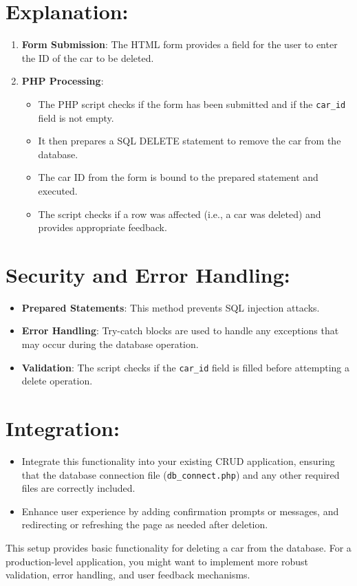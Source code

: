 \documentclass[11pt]{article}
\begin{document}
\section{Explanation:}
\label{sec:org5feed95}
\begin{enumerate}
\item \textbf{Form Submission}: The HTML form provides a field for the user to
enter the ID of the car to be deleted.

\item \textbf{PHP Processing}:

\begin{itemize}
\item The PHP script checks if the form has been submitted and if the
\texttt{car\_id} field is not empty.
\item It then prepares a SQL DELETE statement to remove the car from the
database.
\item The car ID from the form is bound to the prepared statement and
executed.
\item The script checks if a row was affected (i.e., a car was deleted)
and provides appropriate feedback.
\end{itemize}
\end{enumerate}

\section{Security and Error Handling:}
\label{sec:orgeeb2897}
\begin{itemize}
\item \textbf{Prepared Statements}: This method prevents SQL injection attacks.
\item \textbf{Error Handling}: Try-catch blocks are used to handle any exceptions
that may occur during the database operation.
\item \textbf{Validation}: The script checks if the \texttt{car\_id} field is filled before
attempting a delete operation.
\end{itemize}

\section{Integration:}
\label{sec:org1a1a7a6}
\begin{itemize}
\item Integrate this functionality into your existing CRUD application,
ensuring that the database connection file (\texttt{db\_connect.php}) and any
other required files are correctly included.
\item Enhance user experience by adding confirmation prompts or messages,
and redirecting or refreshing the page as needed after deletion.
\end{itemize}

This setup provides basic functionality for deleting a car from the
database. For a production-level application, you might want to
implement more robust validation, error handling, and user feedback
mechanisms.
\end{document}
